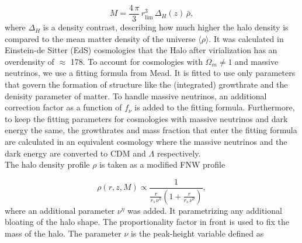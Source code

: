 \documentclass[../main.tex]{subfiles}
\begin{document}
\begin{equation}
    \label{eq:halo-edge}
    M = \frac{4\,\pi}{3}\,r_\mathrm{lim}^3\, \Delta_H(z)\,\bar{\rho},
\end{equation}
where $\Delta_H$ is a density contrast, describing how much higher the halo density is compared to the mean matter density of the universe $\langle{\rho}\rangle$. It was calculated in Einstein-de Sitter (EdS) cosmologies that the Halo after virialization has an overdensity of $\approx$ 178. To account for cosmologies with $\Omega_m\neq 1$ and massive neutrinos, we use a fitting formula from Mead\cite{Mead_2016}. It is fitted to use only parameters that govern the formation of structure like the (integrated) growthrate and the denisity parameter of matter. To handle massive neutrinos, an additional correction factor as a function of $f_\nu$ is added to the fitting formula. Furthermore, to keep the fitting parameters for cosmologies with massive neutrinos and dark energy the same, the growthrates and mass fraction that enter the fitting formula are calculated in an equivalent cosmology where the massive neutrinos and the dark energy are converted to CDM and $\Lambda$ respectively.\\
The halo density profile $\rho$ is taken as a modified FNW \cite{Navarro_1997} profile 

\begin{equation}
    \rho(r,z,M) \propto \frac{1}{\frac{r}{r_s\,\nu^\eta}\left(1+\frac{r}{r_s\,\nu^\eta}\right)},
\end{equation}
where an additional parameter $\nu^\eta$ was added. It parametrizing any additional bloating of the halo shape. The proportionality factor in front is used to fix the mass of the halo. The parameter $\nu$ is the peak-height variable defined as 
\end{document}
